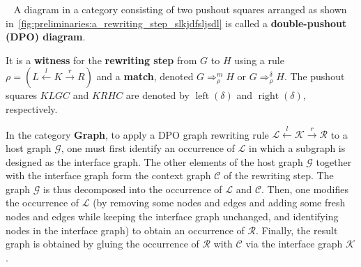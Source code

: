 \begin{definition} 
  \label{def:rewriting_step}
    \ \newline
    \noindent
    A diagram in a category consisting of two pushout squares arranged as shown in~\autoref{fig:preliminaries:a_rewriting_step_slkjdfsljsdl} is called a \textbf{double-pushout (DPO) diagram}.
      \begin{figure}[H]
        \centering
        \caption{}
        \label{fig:preliminaries:a_rewriting_step_slkjdfsljsdl}
      \end{figure}
      It is a \textbf{witness} for the \textbf{rewriting step} from \( G \) to \( H \) using 
      a rule \( \rho = (L \overset{l}{\leftarrow} K \overset{r}{\rightarrow} R) \) and a \textbf{match}, denoted \( G \Rightarrow_\rho^m H \) or \( G \Rightarrow_\rho^\delta H \). The pushout squares $KLGC$ and $KRHC$ are denoted by $\operatorname{left}(\delta)$ and $\operatorname{right}(\delta)$, respectively.
  \end{definition}
In the category \textbf{Graph}, to apply a DPO graph rewriting rule $\mathcal{L} \overset{l}{\leftarrow} \mathcal{K} \overset{r}{\rightarrow} \mathcal{R}$ to a host graph $\mathcal{G}$, one must first identify an occurrence of $\mathcal{L}$ in which a subgraph is designed as the interface graph. The other elements of the host graph $\mathcal{G}$ together with the interface graph form the context graph $\mathcal{C}$ of the rewriting step.
The graph $\mathcal{G}$ is thus decomposed into the occurrence of $\mathcal{L}$ and $\mathcal{C}$. 
Then, one modifies the occurrence of $\mathcal{L}$ (by removing some nodes and edges and adding some fresh nodes and edges while keeping the interface graph unchanged, and identifying nodes in the interface graph)
to obtain an occurrence of $\mathcal{R}$. Finally, the result graph is obtained by gluing the occurrence of $\mathcal{R}$ with $\mathcal{C}$ via the interface graph $\mathcal{K}$.

